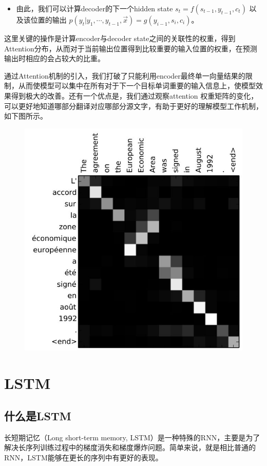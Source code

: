 \documentclass[12pt]{article}
\begin{document}
\begin{framed}
\begin{itemize}
    \item 由此，我们可以计算decoder的下一个hidden state $s_t = f(s_{t-1}, y_{t-1}, c_t)$ 以及该位置的输出 $p(y_t|y_1, \cdots, y_{t-1}, \overrightarrow{x}) = g(y_{i-1}, s_i, c_i)$。
\end{itemize}

这里关键的操作是计算encoder与decoder state之间的关联性的权重，得到Attention分布，从而对于当前输出位置得到比较重要的输入位置的权重，在预测输出时相应的会占较大的比重。


通过Attention机制的引入，我们打破了只能利用encoder最终单一向量结果的限制，从而使模型可以集中在所有对于下一个目标单词重要的输入信息上，使模型效果得到极大的改善。还有一个优点是，我们通过观察attention 权重矩阵的变化，可以更好地知道哪部分翻译对应哪部分源文字，有助于更好的理解模型工作机制，如下图所示。

\begin{figure}[H]
    \centering
    \includegraphics[width=.6\textwidth]{fig/Attention_Weight_Example.jpg}
\end{figure}
\end{framed}


\section{ LSTM\cite{Everyone_Can_Understand_LSTM}}
\subsection{什么是LSTM}
长短期记忆（Long short-term memory, LSTM）是一种特殊的RNN，主要是为了解决长序列训练过程中的梯度消失和梯度爆炸问题。简单来说，就是相比普通的RNN，LSTM能够在更长的序列中有更好的表现。
\end{document}
